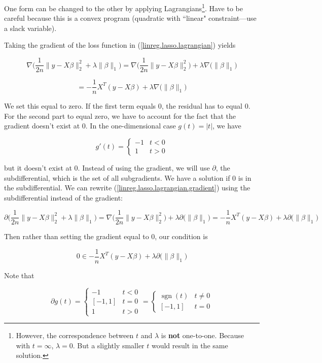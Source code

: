 One form can be changed to the other by applying Lagrangians\footnote{However, the correspondence between \(t\) and \(\lambda\) is \textbf{not} one-to-one. Because with \(t = \infty\), \(\lambda =0\). But a slightly smaller \(t\) would result in the same solution.}. Have to be careful because this is a convex program (quadratic with ``linear" constraint---use a slack variable). 

Taking the gradient of the loss function in (\ref{linreg.lasso.lagrangian}) yields

\[
\nabla \bigg(  \frac{1}{2n}\lVert y - X \beta \rVert_2^2   + \lambda \lVert \beta \rVert_1 \bigg) = \nabla   \bigg( \frac{1}{2n}\lVert y - X \beta \rVert_2^2   \bigg) + \lambda \nabla \big( \lVert \beta \rVert_1 \big)
\]

\begin{equation}\label{linreg.lasso.lagrangian.gradient}
= - \frac{1}{n} X^T(y - X \beta) + \lambda \nabla  \big( \lVert \beta \rVert_1 \big)
\end{equation}

We set this equal to zero. If the first term equals 0, the residual has to equal 0. For the second part to equal zero, we have to account for the fact that the gradient doesn't exist at 0. In the one-dimensional case \(g(t) = |t|\), we have

\[
g'(t) = \begin{cases}
-1 & t < 0 \\
1 & t > 0
\end{cases}
\]

but it doesn't exist at 0. Instead of using the gradient, we will use \(\partial\), the subdifferential, which is the set of all subgradients. We have a solution if 0 is in the subdifferential. We can rewrite (\ref{linreg.lasso.lagrangian.gradient}) using the subdifferential instead of the gradient:

\[
\partial \bigg(  \frac{1}{2n}\lVert y - X \beta \rVert_2^2   + \lambda \lVert \beta \rVert_1 \bigg) = \nabla \bigg(  \frac{1}{2n}\lVert y - X \beta \rVert_2^2  \bigg)  + \lambda \partial \big( \lVert \beta \rVert_1 \big)  =  - \frac{1}{n} X^T(y - X \beta) + \lambda \partial \big( \lVert \beta \rVert_1 \big)
\]

Then rather than setting the gradient equal to 0, our condition is

\[
0 \in - \frac{1}{n} X^T(y - X \beta) + \lambda \partial \big( \lVert \beta \rVert_1 \big)
\]

Note that 

\[
\partial g (t) = \begin{cases}
-1 & t < 0 \\
[-1, 1] & t = 0 \\
1 & t > 0
\end{cases} = \begin{cases}
\operatorname{sgn}(t) & t \neq 0 \\
[-1, 1] & t = 0 
\end{cases}
\]


